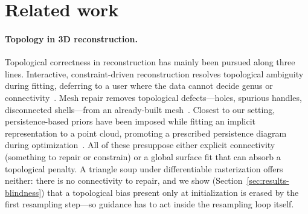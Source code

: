 \section{Related work}
\label{sec:related}

\paragraph{Topology in 3D reconstruction.}
Topological correctness in reconstruction has mainly been pursued along three
lines. Interactive, constraint-driven reconstruction resolves topological
ambiguity during fitting, deferring to a user where the data cannot decide
genus or connectivity~\cite{sharf2007topologyaware}. Mesh repair removes
topological defects---holes, spurious handles, disconnected shells---from an
already-built mesh~\cite{ju2004repair,attene2010repair}. Closest to our
setting, persistence-based priors have been imposed while fitting an implicit
representation to a point cloud, promoting a prescribed persistence diagram
during optimization~\cite{bruel2020toporecon}. All of these presuppose either
explicit connectivity (something to repair or constrain) or a global surface
fit that can absorb a topological penalty. A triangle soup under differentiable
rasterization offers neither: there is no connectivity to repair, and we show
(Section~\ref{sec:results-blindness}) that a topological bias present only at
initialization is erased by the first resampling step---so guidance has to act
inside the resampling loop itself.

